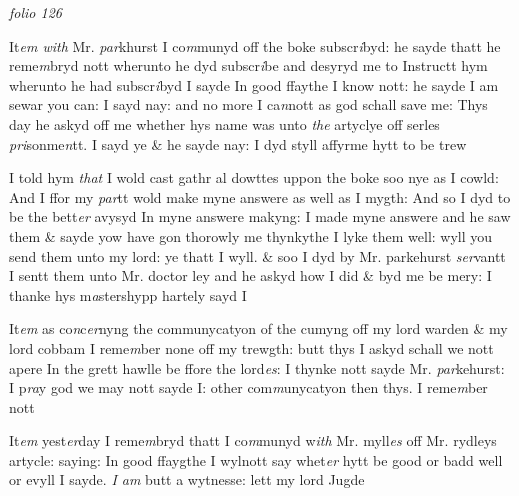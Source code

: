 \documentclass[12pt, a4paper]{book}
\begin{document}
\textit{folio 126}



 	
 		
		\ifthenelse{\isodd{\thepage}}
		{\reversemarginpar}
		{\normalmarginpar}
		It\textit{em with} Mr. \textit{par}khurst I co\textit{m}munyd off the boke subscr\textit{i}byd: he
 sayde thatt he reme\textit{m}bryd nott wherunto he dyd subscr\textit{i}be
 and desyryd me to Instructt hym wherunto he had subscr\textit{i}byd
 I sayde In good ffaythe I know nott: he sayde I am
 sewar you can: I sayd nay: and no more I ca\textit{n}nott as
 god schall save me: Thys day he askyd off me whether
 hys name was unto \textit{the} artyclye off serles \textit{pri}sonme\textit{n}tt. I sayd
 ye \& he sayde nay: I dyd
			 styll affyrme hytt to be trew
 	
 	
		\ifthenelse{\isodd{\thepage}}
		{\reversemarginpar}
		{\normalmarginpar}
		I told hym \textit{that} I wold cast gathr
			 al dowttes uppon the boke soo nye
 as I cowld: And I ffor my \textit{par}tt wold make myne answere
			 as
 well as I mygth: And so I dyd to be the bett\textit{er} avysyd
 In myne answere makyng: I made myne answere
 and he saw them \& sayde yow have gon thorowly me
 thynkythe I lyke them well: wyll you send them unto
 my lord: ye thatt I wyll. \& soo I dyd by Mr. parkehurst
 \textit{ser}vantt I sentt them unto Mr. doctor ley and he askyd how I did
 \& byd me be mery: I thanke hys m\textit{a}stershypp hartely sayd I
 	
		\ifthenelse{\isodd{\thepage}}
		{\reversemarginpar}
		{\normalmarginpar}
		It\textit{em} as co\textit{n}c\textit{er}nyng the communycatyon of the
			 cumyng off my lord warden \& my lord cobbam
 I reme\textit{m}ber none off my trewgth: butt thys I askyd schall
 we nott apere In the grett hawlle be ffore the lord\textit{es}: I
 		thynke nott sayde Mr. \textit{par}kehurst: I p\textit{ra}y god we may nott
 sayde I: other com\textit{m}unycatyon then thys. I reme\textit{m}ber nott

 	
 		
		\ifthenelse{\isodd{\thepage}}
		{\reversemarginpar}
		{\normalmarginpar}
		It\textit{em} yest\textit{er}day I reme\textit{m}bryd thatt I co\textit{m}munyd w\textit{ith} Mr. myll\textit{es}
 			off Mr. rydleys artycle: saying: In good ffaygthe I wylnott  say
 whet\textit{er }hytt be good or badd well or evyll I sayde.\textit{ I am}
 butt a wytnesse: lett my lord Jugde
\end{document}
